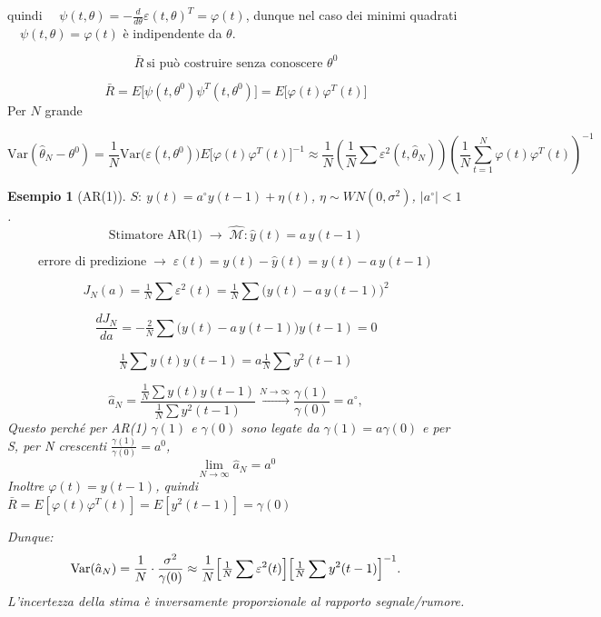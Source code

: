 \documentclass[11pt,a4paper]{article}
\newtheorem{example}{Esempio}
\begin{document}
quindi $\quad \psi(t,\theta)=
-\frac{d}{d\theta}\varepsilon(t,\theta)^{T} 
=
\varphi(t)$, dunque nel caso dei minimi quadrati $\quad \psi(t,\theta)= \varphi(t)$ è indipendente da $\theta$.

\[
\bar R\ \text{si può costruire senza conoscere }\theta^0
\]

\[
\bar R
=
E\bigl[\psi(t,\theta^0)\psi^{T}(t,\theta^0)\bigr]
=
E\bigl[\varphi(t)\varphi^{T}(t)\bigr]
\]
Per $N$ grande

\[
\mathrm{Var}(\hat\theta_N-\theta^0)
=
\frac{1}{N}\mathrm{Var}\bigl(\varepsilon(t,\theta^0)\bigr)
E\bigl[\varphi(t)\varphi^{T}(t)\bigr]^{-1}
\approx
\frac{1}{N}
\left(
\frac{1}{N}\sum\varepsilon^2(t,\hat\theta_N)
\right)
\left(
\frac{1}{N}\sum_{t=1}^{N}\varphi(t)\varphi^{T}(t)
\right)^{-1}
\]

\begin{example}[AR(1)]
$S:\ y(t)=a^\circ y(t-1)+\eta(t)$, $\eta\sim WN(0,\sigma^2)$, $|a^\circ|<1$. 
\\
\[
\text{Stimatore AR(1)} \;\rightarrow\; \hat{\mathcal{M}}:
\hat y(t)=a\,y(t-1)
\]

\[
\text{errore di predizione} \;\rightarrow\;
\varepsilon(t)=y(t)-\hat y(t)=y(t)-a\,y(t-1)
\]

\[
J_N(a)=\tfrac{1}{N}\sum \varepsilon^2(t)
      =\tfrac{1}{N}\sum \bigl(y(t)-a\,y(t-1)\bigr)^2
\]

\[
\frac{dJ_N}{da}
=
-\tfrac{2}{N}\sum \bigl(y(t)-a\,y(t-1)\bigr)y(t-1)
=
0
\]

\[
\tfrac{1}{N}\sum y(t)y(t-1) = a\tfrac{1}{N}\sum y^2(t-1)
\]


\[
\hat a_N=\frac{\tfrac{1}{N}\sum y(t)y(t-1)}{\tfrac{1}{N}\sum y^2(t-1)}\xrightarrow{N\to\infty}\frac{\gamma(1)}{\gamma(0)}=a^\circ,
\]
Questo perché per AR(1) $\gamma(1)$ e $\gamma(0)$ sono legate da $\gamma(1) = a\gamma(0)$ e per S, per N crescenti $\tfrac{\gamma(1)}{\gamma(0)} = a^0$, \[
\lim_{N\to\infty}\hat a_N = a^0
\]
Inoltre $\varphi(t) = y(t-1)$, quindi $\bar R = E[\varphi(t)\varphi^T(t)] = E[y^2(t-1)] = \gamma(0)$

Dunque:
\[
\mathrm{Var}(\hat a_N)=\frac{1}{N}\cdot\frac{\sigma^2}{\gamma(0)}\approx\frac{1}{N}\Bigl[\tfrac{1}{N}\sum\varepsilon^2(t)\Bigr]\Bigl[\tfrac{1}{N}\sum y^2(t-1)\Bigr]^{-1}.
\]
L'incertezza della stima è \emph{inversamente proporzionale al rapporto segnale/rumore}.
\end{example}

\end{document}
